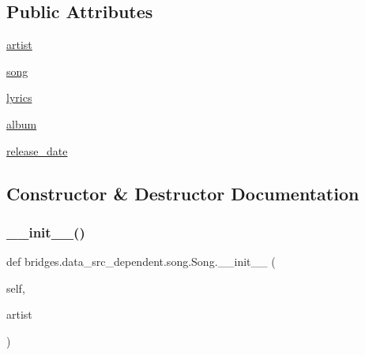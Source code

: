 \subsection*{Public Attributes}
\begin{DoxyCompactItemize}
\item 
\mbox{\hyperlink{classbridges_1_1data__src__dependent_1_1song_1_1_song_a0581174b3d8a941ae22816c8bc3a273d}{artist}}
\item 
\mbox{\hyperlink{classbridges_1_1data__src__dependent_1_1song_1_1_song_a6bd4c03cfdb41aef1dea920df267f53a}{song}}
\item 
\mbox{\hyperlink{classbridges_1_1data__src__dependent_1_1song_1_1_song_a6e187df41c7719fab7feb91dad22618f}{lyrics}}
\item 
\mbox{\hyperlink{classbridges_1_1data__src__dependent_1_1song_1_1_song_a1c5b98e4e8c10a0bdc44ddff84d3f5ed}{album}}
\item 
\mbox{\hyperlink{classbridges_1_1data__src__dependent_1_1song_1_1_song_abb9253cf6cf98398318c8224ec5ec590}{release\+\_\+date}}
\end{DoxyCompactItemize}


\subsection{Constructor \& Destructor Documentation}
\mbox{\label{classbridges_1_1data__src__dependent_1_1song_1_1_song_a7f7384595782d5a3a829aa9f96a92845}} 
\subsubsection{\texorpdfstring{\+\_\+\+\_\+init\+\_\+\+\_\+()}{\_\_init\_\_()}}
{\footnotesize\ttfamily def bridges.\+data\+\_\+src\+\_\+dependent.\+song.\+Song.\+\_\+\+\_\+init\+\_\+\+\_\+ (\begin{DoxyParamCaption}\item[{}]{self,  }\item[{}]{artist }\end{DoxyParamCaption})}



